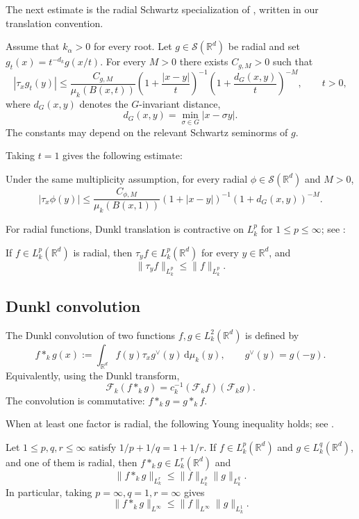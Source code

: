 \documentclass[12pt]{article}
\begin{document}
The next estimate is the radial Schwartz specialization of \cite[Theorem~4.1 and Remark~4.2]{JDA3}, written in our translation convention.
\begin{lemma}\label{LPY}
Assume that $k_\alpha>0$ for every root. Let $g\in\mathcal{S}(\mathbb{R}^d)$ be radial and set $g_t(x)=t^{-d_k}g(x/t)$. For every $M>0$ there exists $C_{g,M}>0$ such that
\[
|\tau_xg_t(y)|\le\frac{C_{g,M}}{\mu_k(B(x,t))}
\left(1+\frac{|x-y|}{t}\right)^{-1}
\left(1+\frac{d_G(x,y)}t\right)^{-M},\qquad t>0,
\]
where $d_G(x,y)$ denotes the $G$-invariant distance,
\begin{equation}\label{EDD}
d_G(x,y)=\min_{\sigma\in G}|x-\sigma y|.
\end{equation}
The constants may depend on the relevant Schwartz seminorms of $g$.
\end{lemma}
Taking $t=1$ gives the following estimate:
\begin{lemma}\label{lem:translation-estimate}
Under the same multiplicity assumption, for every radial $\phi\in\mathcal{S}(\mathbb{R}^d)$ and $M>0$,
\[
|\tau_x\phi(y)|\le\frac{C_{\phi,M}}{\mu_k(B(x,1))}
(1+|x-y|)^{-1}(1+d_G(x,y))^{-M}.
\]
\end{lemma}

For radial functions, Dunkl translation is contractive on $L_k^p$ for $1\le p\le\infty$; see \cite{ST1}:
\begin{lemma}
\label{lem:radial-translation}
If $f \in L_k^p(\mathbb{R}^d)$ is radial, then $\tau_y f \in L_k^p(\mathbb{R}^d)$ for every $y \in \mathbb{R}^d$, and
\[
\| \tau_y f \|_{L_k^p} \leq \| f \|_{L_k^p}.
\]
\end{lemma}

\subsection{Dunkl convolution}

The Dunkl convolution of two functions $f,g \in L_k^2(\mathbb{R}^d)$ is defined by
\[
f *_k g(x) := \int_{\mathbb{R}^d} f(y) \tau_x g^\vee(y) \, \mathrm{d}\mu_k(y), \qquad g^\vee(y) = g(-y).
\]
Equivalently, using the Dunkl transform,
\[
\mathcal{F}_k(f *_k g) = c_k^{-1}(\mathcal{F}_k f)(\mathcal{F}_k g).
\]
The convolution is commutative: $f *_k g = g *_k f$.

When at least one factor is radial, the following Young inequality holds; see \cite{ST1}.
\begin{lemma}
\label{lem:young}
Let $1 \leq p,q,r \leq \infty$ satisfy $1/p + 1/q = 1 + 1/r$. If $f \in L_k^p(\mathbb{R}^d)$ and $g \in L_k^q(\mathbb{R}^d)$, and one of them is radial, then $f *_k g \in L_k^r(\mathbb{R}^d)$ and
\[
\| f *_k g \|_{L_k^r} \leq \| f \|_{L_k^p} \| g \|_{L_k^q}.
\]
In particular, taking $p = \infty, q = 1, r = \infty$ gives
\[
\| f *_k g \|_{L^\infty} \leq \| f \|_{L^\infty} \| g \|_{L_k^1}.
\]

\end{lemma}
  
\end{document}
